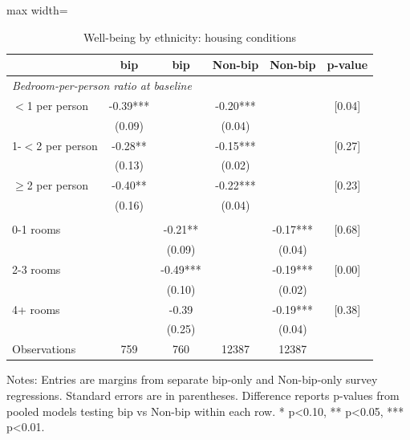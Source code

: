 \begin{table}[htbp]
\centering
\caption{Well-being by ethnicity: housing conditions}
\small
\begin{adjustbox}{max width=\textwidth}
\begin{tabular}{p{5.3cm}ccccc}
\toprule
& bip & bip & Non-bip & Non-bip & p-value \\
\midrule
\multicolumn{6}{l}{\textit{Bedroom-per-person ratio at baseline}} \\
$<$1 per person & -0.39*** &  & -0.20*** &  & [0.04] \\
& (0.09) &  & (0.04) &  & \\
1-$<$2 per person & -0.28** &  & -0.15*** &  & [0.27] \\
& (0.13) &  & (0.02) &  & \\
$\geq$2 per person & -0.40** &  & -0.22*** &  & [0.23] \\
& (0.16) &  & (0.04) &  & \\
\addlinespace
\multicolumn{6}{l}{\textit{Other rooms at baseline}} \\
0-1 rooms &  & -0.21** &  & -0.17*** & [0.68] \\
&  & (0.09) &  & (0.04) & \\
2-3 rooms &  & -0.49*** &  & -0.19*** & [0.00] \\
&  & (0.10) &  & (0.02) & \\
4+ rooms &  & -0.39 &  & -0.19*** & [0.38] \\
&  & (0.25) &  & (0.04) & \\
\midrule
Observations & 759 & 760 & 12387 & 12387 & \\
\bottomrule
\end{tabular}
\end{adjustbox}

\begin{flushleft}
\footnotesize Notes: Entries are margins from separate bip-only and Non-bip-only survey regressions. Standard errors are in parentheses. Difference reports p-values from pooled models testing bip vs Non-bip within each row. * p<0.10, ** p<0.05, *** p<0.01.
\end{flushleft}
\end{table}